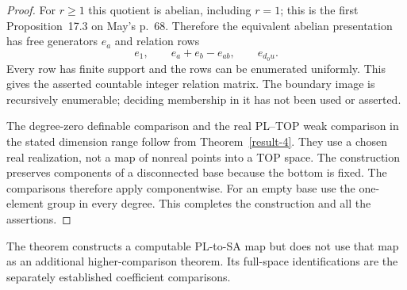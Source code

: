\begin{proof}
For $r\geq1$ this quotient is abelian, including $r=1$; this is
the first Proposition~17.3 on May's p.~68.  Therefore the equivalent
abelian presentation has free generators $e_a$ and relation rows
\[
                   e_1,\qquad e_a+e_b-e_{ab},\qquad e_{d_0u}.
\]
Every row has finite support and the rows can be enumerated uniformly.
This gives the asserted countable integer relation matrix.  The
boundary image is recursively enumerable; deciding membership in it
has not been used or asserted.

The degree-zero definable comparison and the real PL--TOP weak
comparison in the stated dimension range follow from
Theorem~\ref{result-4}.  They use a chosen real realization, not a
map of nonreal points into a TOP space.  The construction preserves
components of a disconnected base because the bottom is fixed.
The comparisons therefore apply componentwise.  For an empty base
use the one-element group in every degree.  This completes the
construction and all the assertions.
\end{proof}

The theorem constructs a computable PL-to-SA map but does not use that
map as an additional higher-comparison theorem.  Its full-space
identifications are the separately established coefficient comparisons.
